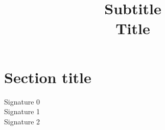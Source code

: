 \documentclass{article}
\title{
  \small Subtitle \\
  \huge Title
}
\author{}
\date{}
\begin{document}
\pagestyle{empty}
\clearpage
\maketitle
\thispagestyle{empty}
 
\section*{Section title}


\begin{flushright}
Signature 0\\
Signature 1\\
Signature 2
\end{flushright}
\end{document}
